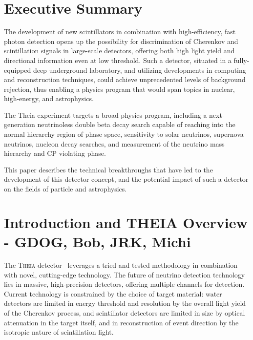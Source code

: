 \section*{Executive Summary}

The  development of new scintillators in combination with high-efficiency, fast photon detection opens up the possibility for discrimination of Cherenkov and scintillation signals in large-scale detectors, offering both high light yield and directional information even at low threshold.  Such a detector, situated in a fully-equipped deep underground laboratory, and utilizing developments in computing and reconstruction techniques, could achieve unprecedented levels of background rejection, thus enabling a physics program that would span topics in nuclear, high-energy, and astrophysics.  

The Theia experiment targets a broad physics program, including a next-generation neutrinoless double beta decay search capable of reaching into the normal hierarchy region of phase space, sensitivity to solar neutrinos, supernova neutrinos, nucleon decay searches, and measurement of the neutrino mass hierarchy and CP violating phase.  

This paper describes the technical breakthroughs that have led to the development of this detector concept, and the potential impact of such a detector on the fields of particle and astrophysics. 

\newpage

\tableofcontents
\setcounter{tocdepth}{5}
\newpage

\section{Introduction and THEIA Overview - GDOG, Bob, JRK, Michi}

The \textsc{Theia}  detector~\cite{asdc} leverages a tried and tested methodology in combination with novel, cutting-edge technology.  
The future of neutrino detection technology lies in massive, high-precision detectors, offering multiple channels for detection.  Current technology is constrained by the choice of target material: water detectors are limited in energy threshold and resolution by the overall light yield of the Cherenkov process, and scintillator detectors are limited in size by optical attenuation in the target itself, and in reconstruction of event direction by the isotropic nature of scintillation light.  

